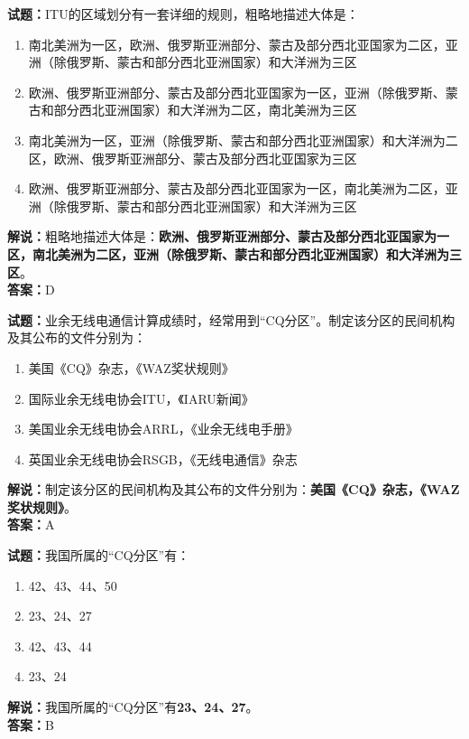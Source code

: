 \documentclass{ctexbook}
\begin{document}
\noindent\textbf{试题：}ITU的区域划分有一套详细的规则，粗略地描述大体是：
\begin{enumerate}[leftmargin=3em]
\item 南北美洲为一区，欧洲、俄罗斯亚洲部分、蒙古及部分西北亚国家为二区，亚洲（除俄罗斯、蒙古和部分西北亚洲国家）和大洋洲为三区
\item 欧洲、俄罗斯亚洲部分、蒙古及部分西北亚国家为一区，亚洲（除俄罗斯、蒙古和部分西北亚洲国家）和大洋洲为二区，南北美洲为三区%
\item 南北美洲为一区，亚洲（除俄罗斯、蒙古和部分西北亚洲国家）和大洋洲为二区，欧洲、俄罗斯亚洲部分、蒙古及部分西北亚国家为三区
\item 欧洲、俄罗斯亚洲部分、蒙古及部分西北亚国家为一区，南北美洲为二区，亚洲（除俄罗斯、蒙古和部分西北亚洲国家）和大洋洲为三区
\end{enumerate}
\noindent\textbf{解说：}粗略地描述大体是：\textbf{欧洲、俄罗斯亚洲部分、蒙古及部分西北亚国家为一区，南北美洲为二区，亚洲（除俄罗斯、蒙古和部分西北亚洲国家）和大洋洲为三区}。\\\noindent\textbf{答案：}D



\bigskip


\noindent\textbf{试题：}业余无线电通信计算成绩时，经常用到“CQ分区”。制定该分区的民间机构及其公布的文件分别为：
\begin{enumerate}[leftmargin=3em]
\item 美国《CQ》杂志，《WAZ奖状规则》
\item 国际业余无线电协会ITU，《IARU新闻》
\item 美国业余无线电协会ARRL，《业余无线电手册》
\item 英国业余无线电协会RSGB，《无线电通信》杂志
\end{enumerate}
\noindent\textbf{解说：}制定该分区的民间机构及其公布的文件分别为：\textbf{美国《CQ》杂志，《WAZ奖状规则》}。\\\noindent\textbf{答案：}A



\bigskip


\noindent\textbf{试题：}我国所属的“CQ分区”有：
\begin{enumerate}[leftmargin=3em]
\item 42、43、44、50
\item 23、24、27
\item 42、43、44
\item 23、24
\end{enumerate}
\noindent\textbf{解说：}我国所属的“CQ分区”有\textbf{23、24、27}。\\\noindent\textbf{答案：}B
\end{document}
